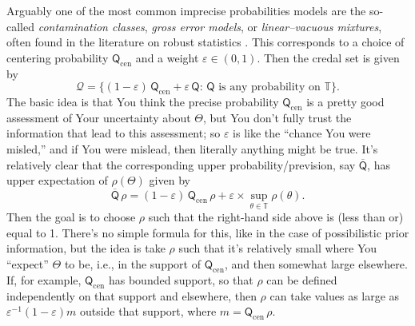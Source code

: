 \documentclass[a4paper, 12pt]{article}
\theoremstyle{plain}
\theoremstyle{definition}
\theoremstyle{remark}
\newcommand{\TT}{\mathbb{T}}
\newcommand{\eps}{\varepsilon}
\newcommand{\prior}{\mathsf{Q}}
\newcommand{\credal}{\mathscr{Q}}
\newcommand{\uprior}{\overline{\mathsf{Q}}}
\begin{document}
Arguably one of the most common imprecise probabilities models are the so-called {\em contamination classes}, {\em gross error models}, or {\em linear--vacuous mixtures}, often found in the literature on robust statistics \citep[e.g.,][]{huber1973.capacity, huber1981, walley1991, walley2002, wasserman1990}.  This corresponds to a choice of centering probability $\prior_\text{cen}$ and a weight $\eps \in (0,1)$.  Then the credal set is given by 
\[ \credal = \bigl\{ (1-\eps) \, \prior_\text{cen} + \eps \, \prior: \, \text{$\prior$ is any probability on $\TT$} \bigr\}. \]
The basic idea is that You think the precise probability $\prior_\text{cen}$ is a pretty good assessment of Your uncertainty about $\Theta$, but You don't fully trust the information that lead to this assessment; so $\eps$ is like the ``chance You were misled,'' and if You were mislead, then literally anything might be true.  It's relatively clear that the corresponding upper probability/prevision, say $\uprior$, has upper expectation of $\rho(\Theta)$ given by 
\[ \uprior\,\rho = (1-\eps) \, \prior_\text{cen}\,\rho + \eps \times \sup_{\theta \in \TT} \rho(\theta). \]
Then the goal is to choose $\rho$ such that the right-hand side above is (less than or) equal to 1.  There's no simple formula for this, like in the case of possibilistic prior information, but the idea is take $\rho$ such that it's relatively small where You ``expect'' $\Theta$ to be, i.e., in the support of $\prior_\text{cen}$, and then somewhat large elsewhere.  If, for example, $\prior_\text{cen}$ has bounded support, so that $\rho$ can be defined independently on that support and elsewhere, then $\rho$ can take values as large as $\eps^{-1}(1-\eps) m$ outside that support, where $m = \prior_\text{cen}\,\rho$. 
\end{document}
